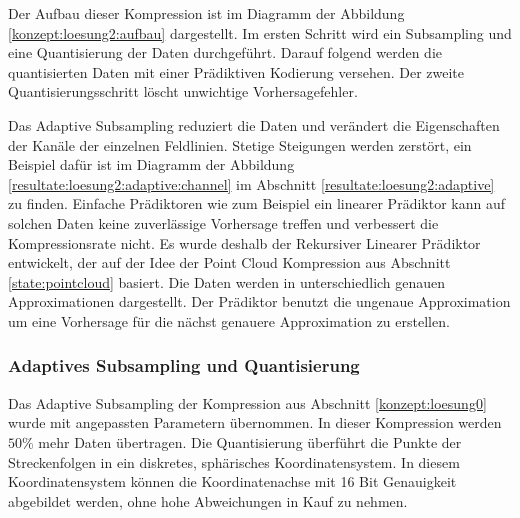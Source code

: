 Der Aufbau dieser Kompression ist im Diagramm der Abbildung \ref{konzept:loesung2:aufbau} dargestellt. Im ersten Schritt wird ein Subsampling und eine Quantisierung der Daten durchgeführt. Darauf folgend werden die quantisierten Daten mit einer Prädiktiven Kodierung versehen. Der zweite Quantisierungsschritt löscht unwichtige Vorhersagefehler. 

Das Adaptive Subsampling reduziert die Daten und verändert die Eigenschaften der Kanäle der einzelnen Feldlinien. Stetige Steigungen werden zerstört, ein Beispiel dafür ist im Diagramm der Abbildung \ref{resultate:loesung2:adaptive:channel} im Abschnitt \ref{resultate:loesung2:adaptive} zu finden. Einfache Prädiktoren wie zum Beispiel ein linearer Prädiktor kann auf solchen Daten keine zuverlässige Vorhersage treffen und verbessert die Kompressionsrate nicht. Es wurde deshalb der Rekursiver Linearer Prädiktor entwickelt, der auf der Idee der Point Cloud Kompression aus Abschnitt \ref{state:pointcloud} basiert. Die Daten werden in unterschiedlich genauen Approximationen dargestellt. Der Prädiktor benutzt die ungenaue Approximation um eine Vorhersage für die nächst genauere Approximation zu erstellen.

\subsubsection{Adaptives Subsampling und Quantisierung}
Das Adaptive Subsampling der Kompression aus Abschnitt \ref{konzept:loesung0} wurde mit angepassten Parametern übernommen. In dieser Kompression werden $50\%$ mehr Daten übertragen. Die Quantisierung überführt die Punkte der Streckenfolgen in ein diskretes, sphärisches Koordinatensystem. In diesem Koordinatensystem können die Koordinatenachse mit 16 Bit Genauigkeit abgebildet werden, ohne hohe Abweichungen in Kauf zu nehmen.

